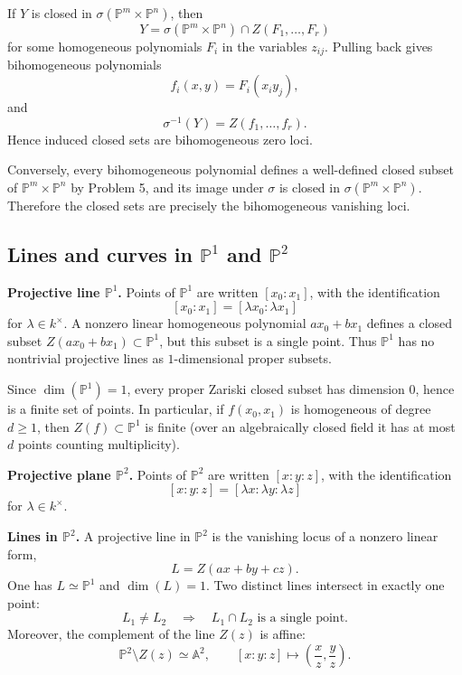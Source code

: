 \documentclass[12pt,a4paper]{article}
\theoremstyle{plain}
\theoremstyle{definition}      %
\begin{document}
If \(Y\) is closed in \(\sigma(\mathbb P^m\times\mathbb P^n)\), then
\[
Y=\sigma(\mathbb P^m\times\mathbb P^n)\cap Z(F_1,\dots,F_r)
\]
for some homogeneous polynomials \(F_i\) in the variables \(z_{ij}\).
Pulling back gives bihomogeneous polynomials
\[
f_i(x,y)=F_i(x_i y_j),
\]
and
\[
\sigma^{-1}(Y)=Z(f_1,\dots,f_r).
\]
Hence induced closed sets are bihomogeneous zero loci.

Conversely, every bihomogeneous polynomial defines a well-defined closed subset of \(\mathbb P^m\times\mathbb P^n\) by Problem 5, and its image under \(\sigma\) is closed in \(\sigma(\mathbb P^m\times\mathbb P^n)\).
Therefore the closed sets are precisely the bihomogeneous vanishing loci.

\subsection*{Lines and curves in \(\mathbb P^1\) and \(\mathbb P^2\)}

\textbf{Projective line \(\mathbb P^1\).}
Points of \(\mathbb P^1\) are written \([x_0:x_1]\), with the identification
\[
[x_0:x_1]=[\lambda x_0:\lambda x_1]
\]
for \(\lambda\in k^\times\).
A nonzero linear homogeneous polynomial \(a x_0+b x_1\) defines a closed subset \(Z(a x_0+b x_1)\subset \mathbb P^1\), but this subset is a single point.
Thus \(\mathbb P^1\) has no nontrivial projective lines as \(1\)-dimensional proper subsets.

Since \(\dim(\mathbb P^1)=1\), every proper Zariski closed subset has dimension \(0\), hence is a finite set of points.
In particular, if \(f(x_0,x_1)\) is homogeneous of degree \(d\ge 1\), then \(Z(f)\subset \mathbb P^1\) is finite (over an algebraically closed field it has at most \(d\) points counting multiplicity).

\textbf{Projective plane \(\mathbb P^2\).}
Points of \(\mathbb P^2\) are written \([x:y:z]\), with the identification
\[
[x:y:z]=[\lambda x:\lambda y:\lambda z]
\]
for \(\lambda\in k^\times\).

\textbf{Lines in \(\mathbb P^2\).}
A projective line in \(\mathbb P^2\) is the vanishing locus of a nonzero linear form,
\[
L=Z(a x+b y+c z).
\]
One has \(L\simeq \mathbb P^1\) and \(\dim(L)=1\).
Two distinct lines intersect in exactly one point:
\[
L_1\neq L_2
\quad\Longrightarrow\quad
L_1\cap L_2
\text{ is a single point.}
\]
Moreover, the complement of the line \(Z(z)\) is affine:
\[
\mathbb P^2\setminus Z(z)\simeq \mathbb A^2,
\qquad
[x:y:z]\mapsto \left(\frac{x}{z},\frac{y}{z}\right).
\]
\end{document}
